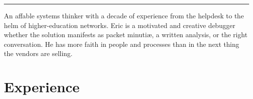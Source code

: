 \documentclass[10pt]{article}
\let\normalsection\section
\begin{document}
\vspace{1mm}
\hrule
\vspace{1mm}
\noindent
\medskip

\begin{tcolorbox}[center, width={\textwidth - 24pt}, title=Who?, fonttitle=\bfseries, coltitle=black, colframe=black, colback=white, colbacktitle=black!25!white, boxrule=0.4pt]
\noindent An affable systems thinker with a decade of experience from the helpdesk to the helm of higher-education networks. Eric is a motivated and creative debugger whether the solution manifests as packet minuti\ae, a written analysis, or the right conversation. He has more faith in people and processes than in the next thing the vendors are selling.
\end{tcolorbox}


\section*{Experience}

\let\section\normalsection
\end{document}
